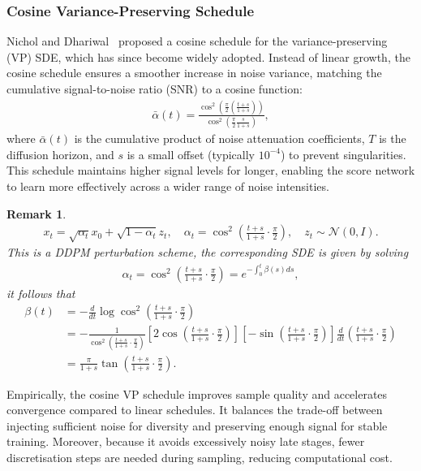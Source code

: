 \documentclass[a4paper,12pt]{article}
\newtheorem{remark}{Remark}[section]
\begin{document}
\subsubsection*{Cosine Variance-Preserving Schedule}
Nichol and Dhariwal~\cite{nicholImprovedDenoisingDiffusion2021} proposed a cosine schedule for the variance-preserving (VP) SDE, which has since become widely adopted. 
Instead of linear growth, the cosine schedule ensures a smoother increase in noise variance, matching the cumulative signal-to-noise ratio (SNR) to a cosine function:
\begin{align*}
    \bar \alpha(t) = \frac{\cos^2\!\left(\frac{\pi}{2}(\frac{t+s}{1+s})\right)}{\cos^2\!\left(\frac{\pi}{2}\frac{s}{1+s}\right)},
\end{align*}
where $\bar \alpha(t)$ is the cumulative product of noise attenuation coefficients, $T$ is the diffusion horizon, and $s$ is a small offset (typically $10^{-4}$) to prevent singularities. 
This schedule maintains higher signal levels for longer, enabling the score network to learn more effectively across a wider range of noise intensities.
\begin{remark}
    \begin{align*}
        x_t=\sqrt{\alpha_t}x_0+\sqrt{1-\alpha_t}z_t,\quad\alpha_t=\cos^2\left(\frac{t+s}{1+s}\cdot\frac{\pi}{2}\right),\quad z_t\sim\mathcal{N}\left(0, I\right).
    \end{align*}
    This is a DDPM perturbation scheme, the corresponding SDE is given by solving
    \begin{align*}
        \alpha_t=\cos^2\left(\frac{t+s}{1+s}\cdot\frac{\pi}{2}\right)=e^{-\int_0^t\beta(s)ds},
    \end{align*}
    it follows that
    \begin{align*}
        \beta(t)
        &=-\frac{d}{dt}\log\cos^2\left(\frac{t+s}{1+s}\cdot\frac{\pi}{2}\right)\\
        &=-\frac{1}{\cos^2\left(\frac{t+s}{1+s}\cdot\frac{\pi}{2}\right)}\left[2\cos\left(\frac{t+s}{1+s}\cdot\frac{\pi}{2}\right)\right]\left[-\sin\left(\frac{t+s}{1+s}\cdot\frac{\pi}{2}\right)\right]\frac{d}{dt}\left(\frac{t+s}{1+s}\cdot\frac{\pi}{2}\right)\\
        &=\frac{\pi}{1+s}\tan\left(\frac{t+s}{1+s}\cdot\frac{\pi}{2}\right).
    \end{align*}
\end{remark}
Empirically, the cosine VP schedule improves sample quality and accelerates convergence compared to linear schedules. It balances the trade-off between injecting sufficient noise for diversity and preserving enough signal for stable training. Moreover, because it avoids excessively noisy late stages, fewer discretisation steps are needed during sampling, reducing computational cost.
\end{document}
